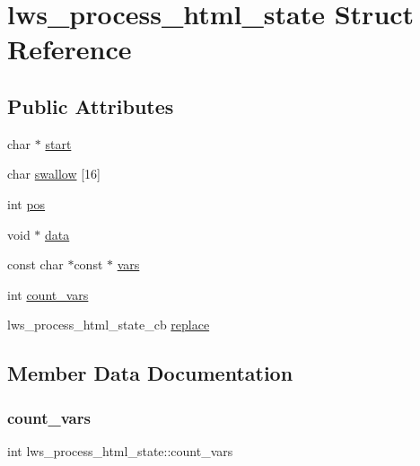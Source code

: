 \hypertarget{structlws__process__html__state}{}\section{lws\+\_\+process\+\_\+html\+\_\+state Struct Reference}
\label{structlws__process__html__state}
\subsection*{Public Attributes}
\begin{DoxyCompactItemize}
\item 
char $\ast$ \hyperlink{structlws__process__html__state_a82741198399981318c76d59781e712d5}{start}
\item 
char \hyperlink{structlws__process__html__state_a28005ed37f78cb29c5e758922907bec2}{swallow} \mbox{[}16\mbox{]}
\item 
int \hyperlink{structlws__process__html__state_a53234f2948812c7208a256f9f5b23c20}{pos}
\item 
void $\ast$ \hyperlink{structlws__process__html__state_ab249ff355a2d4ca5707d5310639eb2df}{data}
\item 
const char $\ast$const  $\ast$ \hyperlink{structlws__process__html__state_ad43c2761417aecee06143f4bb2b5916a}{vars}
\item 
int \hyperlink{structlws__process__html__state_adcafd17704775b4bbeea9561fb340968}{count\+\_\+vars}
\item 
lws\+\_\+process\+\_\+html\+\_\+state\+\_\+cb \hyperlink{structlws__process__html__state_a693d2fb45378afee5da29b539c1ea644}{replace}
\end{DoxyCompactItemize}


\subsection{Member Data Documentation}
\mbox{\label{structlws__process__html__state_adcafd17704775b4bbeea9561fb340968}} 
\subsubsection{\texorpdfstring{count\+\_\+vars}{count\_vars}}
{\footnotesize\ttfamily int lws\+\_\+process\+\_\+html\+\_\+state\+::count\+\_\+vars}

